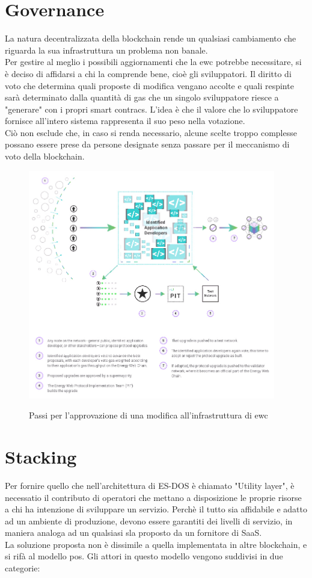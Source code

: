 \documentclass[12pt, letterpaper, twoside]{article}
\begin{document}
\newpage
 
\section{Governance}
La natura decentralizzata della blockchain rende un qualsiasi cambiamento che riguarda la sua infrastruttura un problema non banale. \\
Per gestire al meglio i possibili aggiornamenti che la \gls{ewc} potrebbe necessitare, si è deciso di affidarsi a chi la comprende bene, cioè gli sviluppatori.
Il diritto di voto che determina quali proposte di modifica vengano accolte e quali respinte sarà determinato dalla quantità di gas che un singolo sviluppatore riesce a "generare" con i propri smart contracs.
L'idea è che il valore che lo sviluppatore fornisce all'intero sistema rappresenta il suo peso nella votazione. \cite{wiki:ew-governance} \\
Ciò non esclude che, in caso si renda necessario, alcune scelte troppo complesse possano essere prese da persone designate senza passare per il meccanismo di voto della blockchain.
 
\begin{figure}[!h]
    \includegraphics[height=10cm,keepaspectratio]{ew-governance}
    \centering
    \label{ew-governance}
    \caption{Passi per l'approvazione di una modifica all'infrastruttura di \gls{ewc} \cite{img:ew-governance}}
\end{figure}
 
\newpage
 
\section{Stacking}
Per fornire quello che nell'architettura di ES-DOS è chiamato "Utility layer", è necessatio il contributo di operatori che mettano a disposizione le proprie risorse a chi ha intenzione di sviluppare un servizio.
Perchè il tutto sia affidabile e adatto ad un ambiente di produzione, devono essere garantiti dei livelli di servizio, in maniera analoga ad un qualsiasi \gls{sla} proposto da un fornitore di SaaS. \\
La soluzione proposta non è dissimile a quella implementata in altre blockchain, e si rifà al modello \gls{pos}.
Gli attori in questo modello vengono suddivisi in due categorie:
\end{document}
